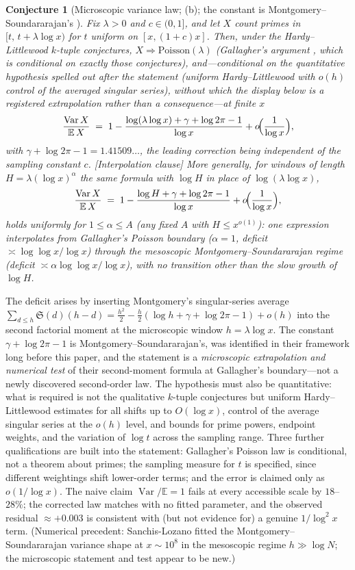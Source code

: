 \documentclass[11pt]{article}
\newtheorem{conjecture}{Conjecture}
\theoremstyle{definition}
\newcommand{\SG}{\mathfrak S}
\begin{document}
\setcounter{conjecture}{12}%
\begin{conjecture}[Microscopic variance law; (b); the constant is
Montgomery--Soundararajan's \cite{MS}]\label{c20}
Fix $\lambda>0$ and $c\in(0,1]$, and let $X$ count primes in
$[t,\,t+\lambda\log x)$ for $t$ uniform on $[x,(1+c)x]$.  Then, under
the Hardy--Littlewood $k$-tuple conjectures,
$X\Rightarrow\mathrm{Poisson}(\lambda)$ (Gallagher's argument
\cite{Gallagher}, which is conditional on exactly those conjectures),
and---\emph{conditional on the quantitative hypothesis} spelled out
after the statement (uniform Hardy--Littlewood with $o(h)$ control
of the averaged singular series), without which the display
below is a registered extrapolation rather than a consequence---at
finite $x$
\[
\frac{\operatorname{Var}X}{\mathbb E\,X}
\;=\;1-\frac{\log(\lambda\log x)+\gamma+\log2\pi-1}{\log x}
+o\!\Bigl(\frac1{\log x}\Bigr),
\]
with $\gamma+\log2\pi-1=1.41509\ldots$, the leading correction being
independent of the sampling constant $c$.  [Interpolation clause]
More generally, for windows of length $H=\lambda(\log x)^{\alpha}$
the \emph{same} formula with $\log H$ in place of
$\log(\lambda\log x)$,
\[
\frac{\operatorname{Var}X}{\mathbb E\,X}
\;=\;1-\frac{\log H+\gamma+\log2\pi-1}{\log x}
+o\!\Bigl(\frac1{\log x}\Bigr),
\]
holds uniformly for $1\le\alpha\le A$ (any fixed $A$ with
$H\le x^{o(1)}$): one expression interpolates from Gallagher's
Poisson boundary ($\alpha=1$, deficit $\asymp\log\log x/\log x$)
through the mesoscopic Montgomery--Soundararajan regime (deficit
$\asymp\alpha\log\log x/\log x$), with no transition other than the
slow growth of $\log H$.
\end{conjecture}

The deficit arises by inserting Montgomery's singular-series average
$\sum_{d\le h}\SG(d)(h-d)=\tfrac{h^2}2-\tfrac h2(\log h+\gamma+\log2\pi
-1)+o(h)$ into the second factorial moment at the microscopic window
$h=\lambda\log x$.  The constant $\gamma+\log2\pi-1$ is
Montgomery--Soundararajan's, was
identified in their framework long before this paper, and the statement
is a \emph{microscopic extrapolation and numerical test} of their
second-moment formula at Gallagher's boundary---not a newly discovered
second-order law.  The hypothesis must also be quantitative: what is
required is not the qualitative $k$-tuple conjectures but uniform
Hardy--Littlewood estimates for all shifts up to $O(\log x)$, control
of the average singular series at the $o(h)$ level, and bounds for
prime powers, endpoint weights, and the variation of $\log t$ across
the sampling range.  Three further qualifications are built into the
statement: Gallagher's Poisson law is conditional, not a theorem about
primes; the sampling measure for $t$ is specified, since different
weightings shift lower-order terms; and the error is claimed only as
$o(1/\log x)$.  The naive claim $\operatorname{Var}/\mathbb E=1$ fails at
every accessible scale by $18$--$28\%$; the corrected law matches with
no fitted parameter, and the observed residual $\approx+0.003$ is
consistent with (but not evidence for) a genuine $1/\log^2x$ term.
(Numerical precedent: Sanchis-Lozano \cite{SL} fitted the
Montgomery--Soundararajan variance shape at $x\sim10^8$ in the
mesoscopic regime $h\gg\log N$; the microscopic statement and test
appear to be new.)
\end{document}
